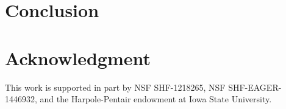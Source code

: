 \documentclass[conference]{IEEEtran}
\begin{document}
\section{Conclusion}


\section*{Acknowledgment}
This work is supported in part by NSF SHF-1218265, NSF SHF-EAGER-1446932, and the Harpole-Pentair endowment at Iowa State University.






\balance


\end{document}
